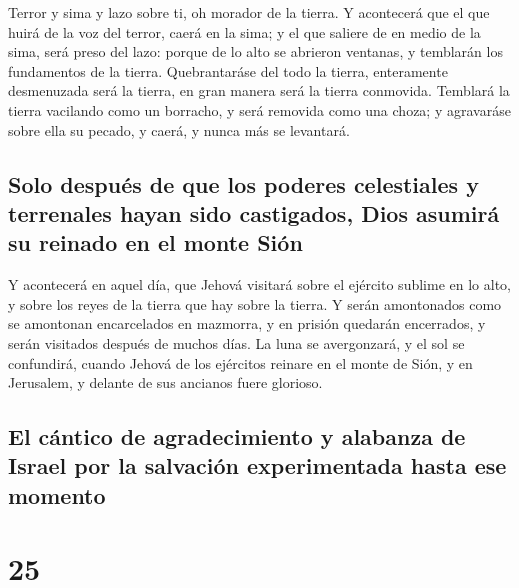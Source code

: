  Terror y sima y lazo sobre ti, oh morador de la tierra.
 Y acontecerá que el que huirá de la voz del terror,
caerá en la sima; y el que saliere de en medio de la sima, será preso
del lazo: porque de lo alto se abrieron ventanas, y temblarán los
fundamentos de la tierra.  Quebrantaráse del todo la
tierra, enteramente desmenuzada será la tierra, en gran manera será la
tierra conmovida.  Temblará la tierra vacilando como un
borracho, y será removida como una choza; y agravaráse sobre ella su
pecado, y caerá, y nunca más se levantará.

\hypertarget{solo-despuuxe9s-de-que-los-poderes-celestiales-y-terrenales-hayan-sido-castigados-dios-asumiruxe1-su-reinado-en-el-monte-siuxf3n}{%
\subsection{Solo después de que los poderes celestiales y terrenales
hayan sido castigados, Dios asumirá su reinado en el monte
Sión}\label{solo-despuuxe9s-de-que-los-poderes-celestiales-y-terrenales-hayan-sido-castigados-dios-asumiruxe1-su-reinado-en-el-monte-siuxf3n}}

 Y acontecerá en aquel día, que Jehová visitará sobre el
ejército sublime en lo alto, y sobre los reyes de la tierra que hay
sobre la tierra.  Y serán amontonados como se amontonan
encarcelados en mazmorra, y en prisión quedarán encerrados, y serán
visitados después de muchos días.  La luna se
avergonzará, y el sol se confundirá, cuando Jehová de los ejércitos
reinare en el monte de Sión, y en Jerusalem, y delante de sus ancianos
fuere glorioso.

\hypertarget{el-cuxe1ntico-de-agradecimiento-y-alabanza-de-israel-por-la-salvaciuxf3n-experimentada-hasta-ese-momento}{%
\subsection{El cántico de agradecimiento y alabanza de Israel por la
salvación experimentada hasta ese
momento}\label{el-cuxe1ntico-de-agradecimiento-y-alabanza-de-israel-por-la-salvaciuxf3n-experimentada-hasta-ese-momento}}

\hypertarget{section-23-25}{%
\section{25}\label{section-23-25}}

